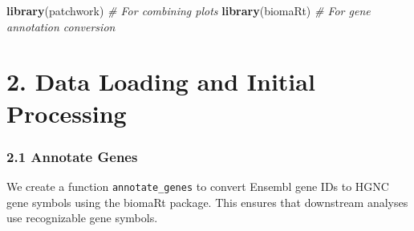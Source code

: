 \documentclass[
]{article}
\newenvironment{Shaded}{\begin{snugshade}}{\end{snugshade}}
\newcommand{\CommentTok}[1]{\textcolor[rgb]{0.56,0.35,0.01}{\textit{#1}}}
\newcommand{\FunctionTok}[1]{\textcolor[rgb]{0.13,0.29,0.53}{\textbf{#1}}}
\newcommand{\NormalTok}[1]{#1}
\begin{document}
\begin{Shaded}
\begin{Highlighting}[]
\FunctionTok{library}\NormalTok{(patchwork)      }\CommentTok{\# For combining plots}
\FunctionTok{library}\NormalTok{(biomaRt)        }\CommentTok{\# For gene annotation conversion}
\end{Highlighting}
\end{Shaded}

\section{2. Data Loading and Initial
Processing}\label{data-loading-and-initial-processing}

\subsubsection{2.1 Annotate Genes}\label{annotate-genes}

We create a function \texttt{annotate\_genes} to convert Ensembl gene
IDs to HGNC gene symbols using the biomaRt package. This ensures that
downstream analyses use recognizable gene symbols.
\end{document}
